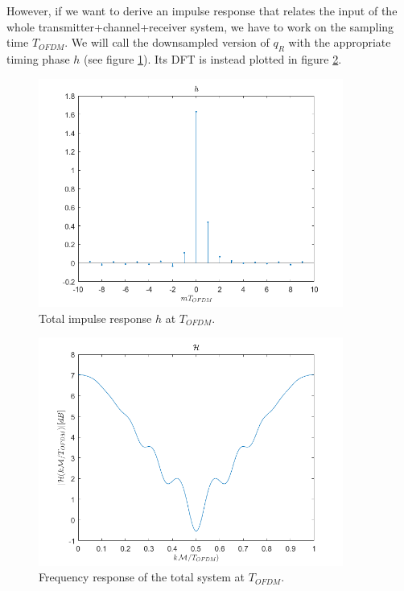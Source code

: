 \documentclass[a4paper,11.5pt]{article}
\begin{document}
However, if we want to derive an impulse response that relates the input of the whole transmitter+channel+receiver system, we have to work on the sampling time $T_{OFDM}$. We will call the downsampled version of $q_R$ with the appropriate timing phase $h$ (see figure \ref{fig:h}). Its DFT is instead plotted in figure \ref{fig:H}. 

\begin{figure}[H]
	\begin{center}   
		\includegraphics[width=10cm]{figs/h.png} 
		\caption{Total impulse response $h$ at $T_{OFDM}$.}
		\label{fig:h}
	\end{center}
\end{figure}



\begin{figure}[H]
	\begin{center}   
		\includegraphics[width=10cm]{figs/H_mag.png} 
		\caption{Frequency response of the total system at $T_{OFDM}$.}
		\label{fig:H}
	\end{center}
\end{figure}
\end{document}
